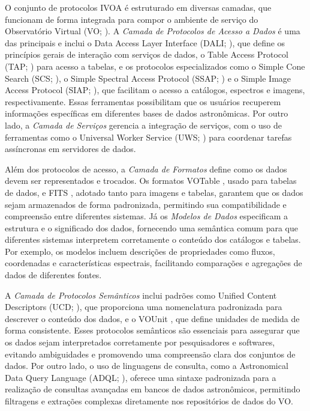 O conjunto de protocolos IVOA é estruturado em diversas camadas, que funcionam de forma integrada para compor o ambiente de serviço do Observatório Virtual (VO; \citealp{voarch}). A \emph{Camada de Protocolos de Acesso a Dados} é uma das principais e inclui o Data Access Layer Interface (DALI; \citealp{dali}), que define os princípios gerais de interação com serviços de dados, o Table Access Protocol (TAP; \citealp{tap}) para acesso a tabelas, e os protocolos especializados como o Simple Cone Search (SCS; \citealp{scs}), o Simple Spectral Access Protocol (SSAP; \citealp{ssa}) e o Simple Image Access Protocol (SIAP; \citealp{siap}), que facilitam o acesso a catálogos, espectros e imagens, respectivamente. Essas ferramentas possibilitam que os usuários recuperem informações específicas em diferentes bases de dados astronômicas. Por outro lado, a \emph{Camada de Serviços} gerencia a integração de serviços, com o uso de ferramentas como o Universal Worker Service (UWS; \citealp{uws}) para coordenar tarefas assíncronas em servidores de dados.

Além dos protocolos de acesso, a \emph{Camada de Formatos} define como os dados devem ser representados e trocados. Os formatos VOTable \cite{votable}, usado para tabelas de dados, e FITS \cite{fits}, adotado tanto para imagens e tabelas, garantem que os dados sejam armazenados de forma padronizada, permitindo sua compatibilidade e compreensão entre diferentes sistemas. Já os \emph{Modelos de Dados} \cite{vomodel} especificam a estrutura e o significado dos dados, fornecendo uma semântica comum para que diferentes sistemas interpretem corretamente o conteúdo dos catálogos e tabelas. Por exemplo, os modelos incluem descrições de propriedades como fluxos, coordenadas e características espectrais, facilitando comparações e agregações de dados de diferentes fontes.

A \emph{Camada de Protocolos Semânticos} inclui padrões como Unified Content Descriptors (UCD; \citealp{ucd}), que proporciona uma nomenclatura padronizada para descrever o conteúdo dos dados, e o VOUnit \cite{vounit}, que define unidades de medida de forma consistente. Esses protocolos semânticos são essenciais para assegurar que os dados sejam interpretados corretamente por pesquisadores e softwares, evitando ambiguidades e promovendo uma compreensão clara dos conjuntos de dados. Por outro lado, o uso de linguagens de consulta, como a Astronomical Data Query Language (ADQL; \citealp{adql}), oferece uma sintaxe padronizada para a realização de consultas avançadas em bancos de dados astronômicos, permitindo filtragens e extrações complexas diretamente nos repositórios de dados do VO.

